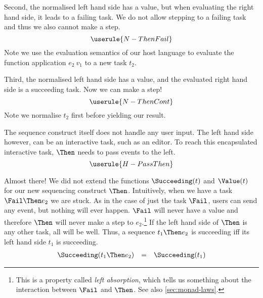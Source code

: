 Second,
the normalised left hand side has a value,
but when evaluating the right hand side,
it leads to a failing task.
We do not allow stepping to a failing task
and thus we also cannot make a step.
\begin{equation*}
  \userule{N-ThenFail}
\end{equation*}
Note we use the evaluation semantics of our host language
to evaluate the function application $e_2\ v_1$ to a new task $t_2$.

Third,
the normalised left hand side has a value,
and the evaluated right hand side is a succeeding task.
Now we can make a step!
\begin{equation*}
  \userule{N-ThenCont}
\end{equation*}
Note we normalise $t_2$ first before yielding our result.

The sequence construct itself does not handle any user input.
The left hand side however,
can be an interactive task, such as an editor.
To reach this encapsulated interactive task,
$\Then$ needs to pass events to the left.
\begin{equation*}
  \userule{H-PassThen}
\end{equation*}

Almost there!
We did not extend the functions $\Succeeding(t)$ and $\Value(t)$ for our new sequencing construct $\Then$.
Intuitively,
when we have a task $\Fail \Then e_2$ we are stuck.
As in the case of just the task $\Fail$,
users can send any event,
but nothing will ever happen.
$\Fail$ will never have a value
and therefore $\Then$ will never make a step to $e_2$.\footnote{
  This is a property called \emph{left absorption},
  which tells us something about the interaction between $\Fail$ and $\Then$.
  See also \autoref{sec:monad-laws}.
}
If the left hand side of $\Then$ is any other task,
all will be well.
Thus,
a sequence $t_1 \Then e_2$ is succeeding iff its left hand side $t_1$ is succeeding.
\begin{equation*}
  \begin{array}{lcl}
    \Succeeding(t_1 \Then e_2) &=& \Succeeding(t_1)
  \end{array}
\end{equation*}

